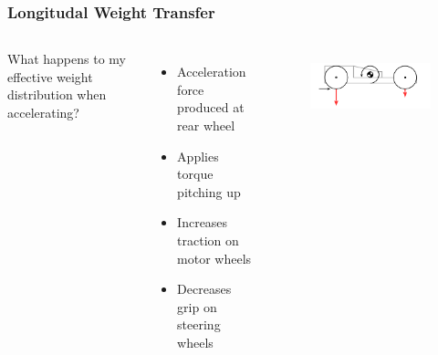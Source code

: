 \documentclass{beamer}
\begin{document}
\begin{frame}
\frametitle{Longitudal Weight Transfer}
\begin{columns}[t]
  What happens to my effective weight distribution when accelerating?
   {
  \begin{itemize}
    \item Acceleration force produced at rear wheel
    \item Applies torque pitching up
    \item Increases traction on motor wheels
    \item Decreases grip on steering wheels
  \end{itemize}
  }
  \begin{figure}
    \centering
     {
    \includegraphics[scale=0.3]{images-dis12/car-weighttransfer-longitudal-fbd}
    }
  \end{figure}
\end{columns}
\end{frame}
\end{document}

